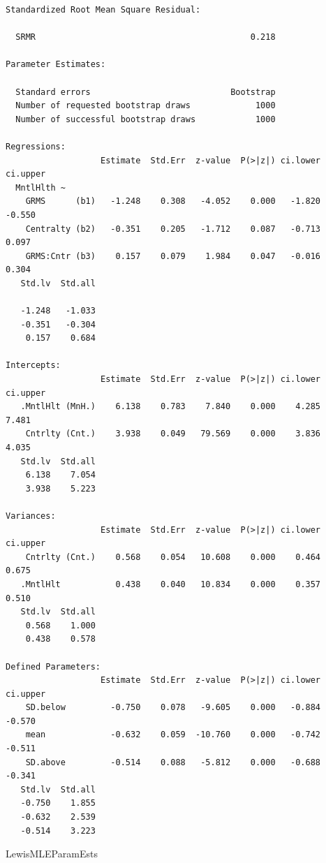 \documentclass[
  11pt,
]{book}
\newenvironment{Shaded}{\begin{snugshade}}{\end{snugshade}}
\newcommand{\NormalTok}[1]{#1}
\begin{document}
\begin{verbatim}
Standardized Root Mean Square Residual:

  SRMR                                           0.218

Parameter Estimates:

  Standard errors                            Bootstrap
  Number of requested bootstrap draws             1000
  Number of successful bootstrap draws            1000

Regressions:
                   Estimate  Std.Err  z-value  P(>|z|) ci.lower ci.upper
  MntlHlth ~                                                            
    GRMS      (b1)   -1.248    0.308   -4.052    0.000   -1.820   -0.550
    Centralty (b2)   -0.351    0.205   -1.712    0.087   -0.713    0.097
    GRMS:Cntr (b3)    0.157    0.079    1.984    0.047   -0.016    0.304
   Std.lv  Std.all
                  
   -1.248   -1.033
   -0.351   -0.304
    0.157    0.684

Intercepts:
                   Estimate  Std.Err  z-value  P(>|z|) ci.lower ci.upper
   .MntlHlt (MnH.)    6.138    0.783    7.840    0.000    4.285    7.481
    Cntrlty (Cnt.)    3.938    0.049   79.569    0.000    3.836    4.035
   Std.lv  Std.all
    6.138    7.054
    3.938    5.223

Variances:
                   Estimate  Std.Err  z-value  P(>|z|) ci.lower ci.upper
    Cntrlty (Cnt.)    0.568    0.054   10.608    0.000    0.464    0.675
   .MntlHlt           0.438    0.040   10.834    0.000    0.357    0.510
   Std.lv  Std.all
    0.568    1.000
    0.438    0.578

Defined Parameters:
                   Estimate  Std.Err  z-value  P(>|z|) ci.lower ci.upper
    SD.below         -0.750    0.078   -9.605    0.000   -0.884   -0.570
    mean             -0.632    0.059  -10.760    0.000   -0.742   -0.511
    SD.above         -0.514    0.088   -5.812    0.000   -0.688   -0.341
   Std.lv  Std.all
   -0.750    1.855
   -0.632    2.539
   -0.514    3.223
\end{verbatim}

\begin{Shaded}
\begin{Highlighting}[]
\NormalTok{LewisMLEParamEsts}
\end{Highlighting}
\end{Shaded}
\end{document}
